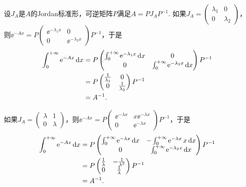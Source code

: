 \begin{solution}
  \begin{inparaenum}[(a)]
    \item 设$J_A$是$A$的Jordan标准形，可逆矩阵$P$满足$A=PJ_AP^{-1}$. 如果$J_A=\begin{pmatrix}
          \lambda_1 & 0\\
          0 & \lambda_2
        \end{pmatrix}$，则$\ee^{-Ax}=P\begin{pmatrix}
          \ee^{-\lambda_1x} & 0 \\
          0 & \ee^{-\lambda_2x}
        \end{pmatrix}P^{-1}$，于是
        \begin{align*}
          \int_0^{+\infty} \ee^{-Ax} \dif x & = P
          \begin{pmatrix}
            \int_0^{+\infty}\ee^{-\lambda_1x} \dif x & 0 \\
            0 & \int_0^{+\infty}\ee^{-\lambda_2x} \dif x
          \end{pmatrix}P^{-1} \\
          & = P \begin{pmatrix}
            \frac1{\lambda_1} & 0 \\
            0 & \frac1{\lambda_2}
          \end{pmatrix} P^{-1} \\
          & = A^{-1}.
        \end{align*}

    如果$J_A=\begin{pmatrix}
      \lambda & 1 \\
      0 & \lambda
    \end{pmatrix}$，则$\ee^{-Ax}=P\begin{pmatrix}
          \ee^{-\lambda x} & x\ee^{-\lambda x} \\
          0 & \ee^{-\lambda x}
        \end{pmatrix}P^{-1}$，于是
        \begin{align*}
          \int_0^{+\infty} \ee^{-Ax} \dif x & = P
          \begin{pmatrix}
            \int_0^{+\infty}\ee^{-\lambda x} \dif x & -\int_0^{+\infty}\ee^{-\lambda x}x\dif x \\
            0 & \int_0^{+\infty}\ee^{-\lambda_2x} \dif x
          \end{pmatrix}P^{-1} \\
          & = P \begin{pmatrix}
            \frac1{\lambda} & -\frac1{\lambda^2} \\
            0 & \frac1{\lambda}
          \end{pmatrix} P^{-1} \\
          & = A^{-1}.
        \end{align*}


\end{inparaenum}
\end{solution}
